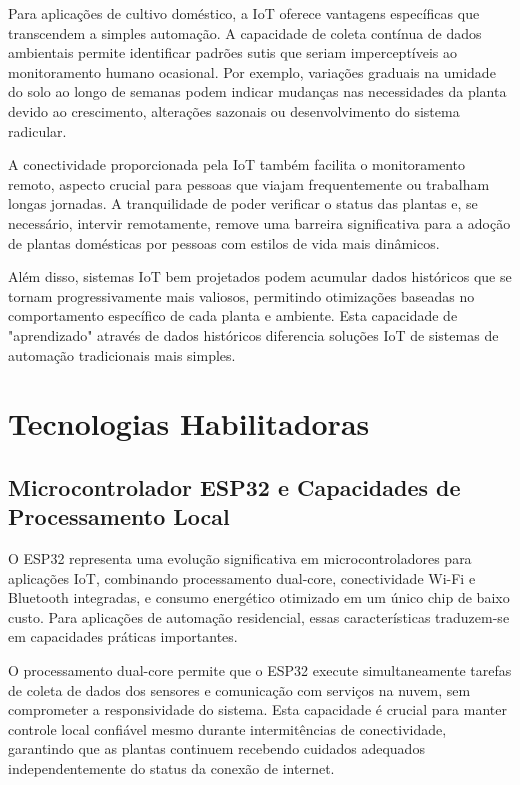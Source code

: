 \documentclass[twoside,english,brazilian]{UNISINOSmonografia}
\begin{document}
Para aplicações de cultivo doméstico, a IoT oferece vantagens específicas que transcendem a simples automação. A capacidade de coleta contínua de dados ambientais permite identificar padrões sutis que seriam imperceptíveis ao monitoramento humano ocasional. Por exemplo, variações graduais na umidade do solo ao longo de semanas podem indicar mudanças nas necessidades da planta devido ao crescimento, alterações sazonais ou desenvolvimento do sistema radicular.

A conectividade proporcionada pela IoT também facilita o monitoramento remoto, aspecto crucial para pessoas que viajam frequentemente ou trabalham longas jornadas. A tranquilidade de poder verificar o status das plantas e, se necessário, intervir remotamente, remove uma barreira significativa para a adoção de plantas domésticas por pessoas com estilos de vida mais dinâmicos.

Além disso, sistemas IoT bem projetados podem acumular dados históricos que se tornam progressivamente mais valiosos, permitindo otimizações baseadas no comportamento específico de cada planta e ambiente. Esta capacidade de "aprendizado" através de dados históricos diferencia soluções IoT de sistemas de automação tradicionais mais simples.

\section{Tecnologias Habilitadoras}

\subsection{Microcontrolador ESP32 e Capacidades de Processamento Local}

O ESP32 representa uma evolução significativa em microcontroladores para aplicações IoT, combinando processamento dual-core, conectividade Wi-Fi e Bluetooth integradas, e consumo energético otimizado em um único chip de baixo custo. Para aplicações de automação residencial, essas características traduzem-se em capacidades práticas importantes.

O processamento dual-core permite que o ESP32 execute simultaneamente tarefas de coleta de dados dos sensores e comunicação com serviços na nuvem, sem comprometer a responsividade do sistema. Esta capacidade é crucial para manter controle local confiável mesmo durante intermitências de conectividade, garantindo que as plantas continuem recebendo cuidados adequados independentemente do status da conexão de internet.
\end{document}
